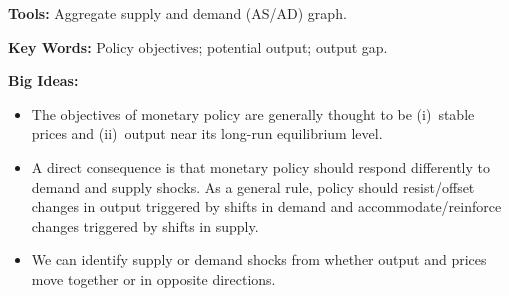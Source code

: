 \textbf{Tools:} Aggregate supply and demand (AS/AD) graph.

\textbf{Key Words:} Policy objectives; potential output; output gap.

\textbf{Big Ideas:}
\begin{itemize}
    \item The objectives of monetary policy are generally thought to be (i)~stable prices and (ii)~output near its long-run equilibrium level.
\item A direct consequence is that monetary policy should respond differently to demand and supply shocks.
As a general rule, policy should resist/offset changes in output triggered by shifts in demand
and accommodate/reinforce changes triggered by shifts in supply.
    \item We can identify supply or demand shocks from whether output and prices move together or in opposite directions.
\end{itemize}
